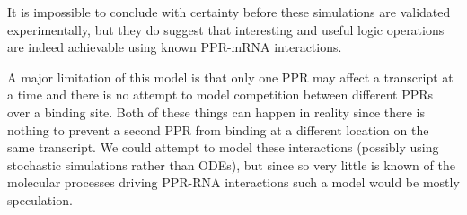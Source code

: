 It is impossible to conclude with certainty before these simulations are
validated experimentally, but they do suggest that interesting and useful logic 
operations are indeed achievable using known PPR-mRNA interactions.

A major limitation of this model is that only one PPR may affect a transcript
at a time and there is no attempt to model competition between different PPRs 
over a binding site.
Both of these things can happen in reality since there is nothing to prevent a 
second PPR from binding at a different location on the same transcript.
We could attempt to model these interactions (possibly using stochastic
simulations rather than ODEs), but since so very little is known of the 
molecular processes driving PPR-RNA interactions such a model would be mostly
speculation.


